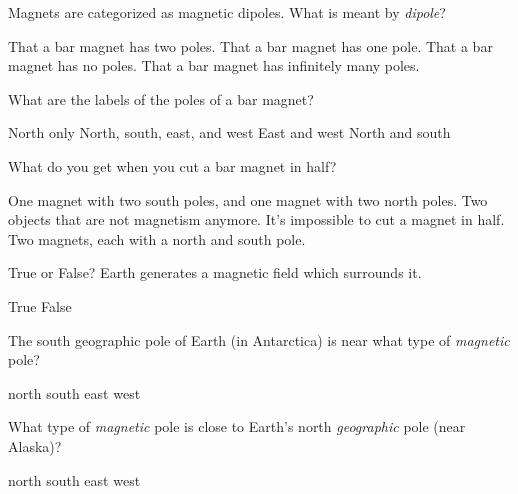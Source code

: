 \documentclass{exam}
\begin{document}
\begin{questions}

\question
Magnets are categorized as magnetic dipoles. What is meant by \textit{dipole}?

\begin{randomizechoices}
    \correctchoice That a bar magnet has two poles.
    \choice That a bar magnet has one pole.
    \choice That a bar magnet has no poles.
    \choice That a bar magnet has infinitely many poles.
\end{randomizechoices}

\question
What are the labels of the poles of a bar magnet?

\begin{randomizechoices}
\choice North only
\choice North, south, east, and west
\choice East and west
\CorrectChoice North and south
\end{randomizechoices}

\question
What do you get when you cut a bar magnet in half?

\begin{randomizechoices}
\choice One magnet with two south poles, and one magnet with two north poles.
\choice Two objects that are not magnetism anymore.
\choice It’s impossible to cut a magnet in half.
\CorrectChoice Two magnets, each with a north and south pole.
\end{randomizechoices}

\question
True or False? Earth generates a magnetic field which surrounds it.

\begin{randomizechoices}
    \correctchoice True
    \choice False
\end{randomizechoices}

\question
The south geographic pole of Earth (in Antarctica) is near what type of \textit{magnetic} pole?

\begin{randomizechoices}
    \correctchoice north
    \choice south
    \choice east
    \choice west
\end{randomizechoices}


\question
What type of \textit{magnetic} pole is close to Earth's north \textit{geographic} pole (near Alaska)? 

\begin{randomizechoices}
\choice north
\CorrectChoice south
\choice east
\choice west
\end{randomizechoices}



\end{questions}
\end{document}
